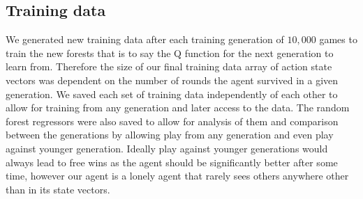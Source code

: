 	\subsection{Training data}
	We generated new training data after each training generation of $10,000$ games to train the new forests that is to say the Q function for the next generation to learn from. Therefore the size of our final training data array of action state vectors was dependent on the number of rounds the agent survived in a given generation. We saved each set of training data independently of each other to allow for training from any generation and later access to the data. The random forest regressors were also saved to allow for analysis of them and comparison between the generations by allowing play from any generation and even play against younger generation. Ideally play against younger generations would always lead to free wins as the agent should be significantly better after some time, however our agent is a lonely agent that rarely sees others anywhere other than in its state vectors.
